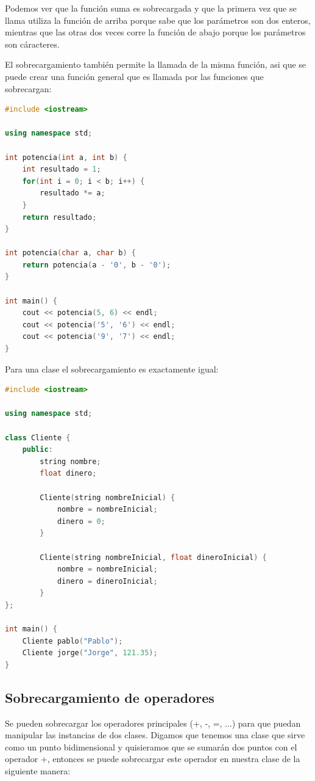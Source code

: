 \documentclass{article}
\begin{document}
Podemos ver que la función suma es sobrecargada y que la primera vez que se llama utiliza la función de arriba porque sabe que los parámetros son dos enteros, mientras que las otras dos veces corre la función de abajo porque los parámetros son cáracteres.

El sobrecargamiento también permite la llamada de la misma función, asi que se puede crear una función general que es llamada por las funciones que sobrecargan:

\begin{lstlisting}[language=C++, title=Sobrecargamiento]
#include <iostream>

using namespace std;

int potencia(int a, int b) {
	int resultado = 1;
	for(int i = 0; i < b; i++) {
		resultado *= a;
	}
	return resultado;
}

int potencia(char a, char b) {
	return potencia(a - '0', b - '0');
}

int main() {
	cout << potencia(5, 6) << endl;
	cout << potencia('5', '6') << endl;
	cout << potencia('9', '7') << endl;
}
\end{lstlisting}

Para una clase el sobrecargamiento es exactamente igual:

\begin{lstlisting}[language=C++, title=Sobrecargamiento de clases]
#include <iostream>

using namespace std;

class Cliente {
	public:
		string nombre;
		float dinero;

		Cliente(string nombreInicial) {
			nombre = nombreInicial;
			dinero = 0;
		}

		Cliente(string nombreInicial, float dineroInicial) {
			nombre = nombreInicial;
			dinero = dineroInicial;
		}
};

int main() {
	Cliente pablo("Pablo");
	Cliente jorge("Jorge", 121.35);
}
\end{lstlisting}

\subsection{Sobrecargamiento de operadores}

Se pueden sobrecargar los operadores principales (+, -, =, ...) para que puedan manipular las instancias de dos clases. Digamos que tenemos una clase que sirve como un punto bidimensional y quisieramos que se sumarán dos puntos con el operador +, entonces se puede sobrecargar este operador en nuestra clase de la siguiente manera:
\end{document}
